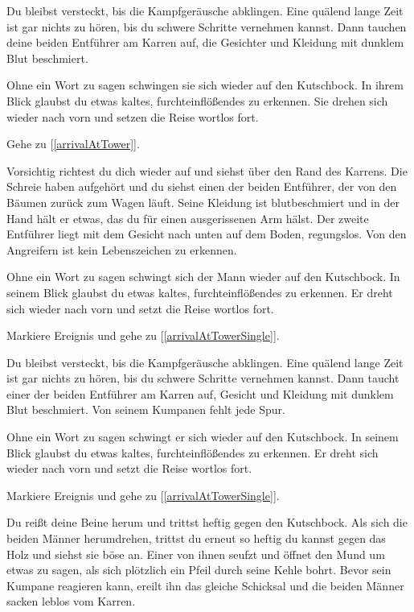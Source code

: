 
Du bleibst versteckt, bis die Kampfgeräusche abklingen. Eine quälend lange Zeit ist gar nichts zu hören, bis du schwere Schritte vernehmen kannst. Dann tauchen deine beiden Entführer am Karren auf, die Gesichter und Kleidung mit dunklem Blut beschmiert.

Ohne ein Wort zu sagen schwingen sie sich wieder auf den Kutschbock. In ihrem Blick glaubst du etwas kaltes, furchteinflößendes zu erkennen. Sie drehen sich wieder nach vorn und setzen die Reise wortlos fort.

Gehe zu [\ref{arrivalAtTower}].


Vorsichtig richtest du dich wieder auf und siehst über den Rand des Karrens. Die Schreie haben aufgehört und du siehst einen der beiden Entführer, der von den Bäumen zurück zum Wagen läuft. Seine Kleidung ist blutbeschmiert und in der Hand hält er etwas, das du für einen ausgerissenen Arm hälst. Der zweite Entführer liegt mit dem Gesicht nach unten auf dem Boden, regungslos. Von den Angreifern ist kein Lebenszeichen zu erkennen.

Ohne ein Wort zu sagen schwingt sich der Mann wieder auf den Kutschbock. In seinem Blick glaubst du etwas kaltes, furchteinflößendes zu erkennen. Er dreht sich wieder nach vorn und setzt die Reise wortlos fort.

Markiere Ereignis  und gehe zu [\ref{arrivalAtTowerSingle}].


Du bleibst versteckt, bis die Kampfgeräusche abklingen. Eine quälend lange Zeit ist gar nichts zu hören, bis du schwere Schritte vernehmen kannst. Dann taucht einer der beiden Entführer am Karren auf, Gesicht und Kleidung mit dunklem Blut beschmiert. Von seinem Kumpanen fehlt jede Spur.

Ohne ein Wort zu sagen schwingt er sich wieder auf den Kutschbock. In seinem Blick glaubst du etwas kaltes, furchteinflößendes zu erkennen. Er dreht sich wieder nach vorn und setzt die Reise wortlos fort.

Markiere Ereignis  und gehe zu [\ref{arrivalAtTowerSingle}].


Du reißt deine Beine herum und trittst heftig gegen den Kutschbock. Als sich die beiden Männer herumdrehen, trittst du erneut so heftig du kannst gegen das Holz und siehst sie böse an. Einer von ihnen seufzt und öffnet den Mund um etwas zu sagen, als sich plötzlich ein Pfeil durch seine Kehle bohrt. Bevor sein Kumpane reagieren kann, ereilt ihn das gleiche Schicksal und die beiden Männer sacken leblos vom Karren.

